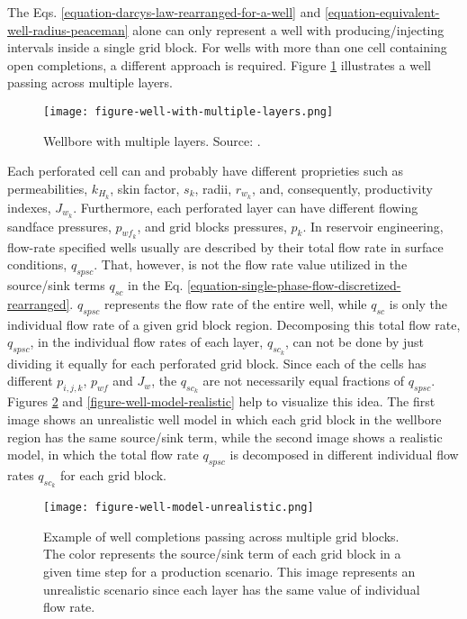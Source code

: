 The Eqs. \ref{equation-darcys-law-rearranged-for-a-well} and \ref{equation-equivalent-well-radius-peaceman} alone can only represent a well with producing/injecting intervals inside a single grid block.
%
For wells with more than one cell containing open completions, a different approach is required.
%
Figure \ref{figure-well-with-multiple-layers} illustrates a well passing across multiple layers.
%
\begin{figure}[h]
	\centering
	\texttt{[image: figure-well-with-multiple-layers.png]}
	\caption{Wellbore with multiple layers. Source: \cite{Ertekin2001}.}
	\label{figure-well-with-multiple-layers}
\end{figure}
%
Each perforated cell can and probably have different proprieties such as permeabilities, $k_{H_k}$, skin factor, $s_k$, radii, $r_{w_k}$, and, consequently, productivity indexes, $J_{w_k}$.
%
Furthermore, each perforated layer can have different flowing sandface pressures, $p_{{wf}_k}$, and grid blocks pressures, ${p_k}$.
%
In reservoir engineering, flow-rate specified wells usually are described by their total flow rate in surface conditions, $q_{spsc}$.
%
That, however, is not the flow rate value utilized in the source/sink terms $q_{sc}$ in the Eq. \ref{equation-single-phase-flow-discretized-rearranged}.
%
$q_{spsc}$ represents the flow rate of the entire well, while $q_{sc}$ is only the individual flow rate of a given grid block region.
%
Decomposing this total flow rate, $q_{spsc}$, in the individual flow rates of each layer, $q_{{sc}_k}$, can not be done by just dividing it equally for each perforated grid block.
%
Since each of the cells has different $p_{i,j,k}$, $p_{wf}$ and $J_{w}$, the $q_{{sc}_k}$ are not necessarily equal fractions of $q_{spsc}$.
%
Figures \ref{figure-well-model-unrealistic} and \ref{figure-well-model-realistic} help to visualize this idea.
%
The first image shows an unrealistic well model in which each grid block in the wellbore region has the same source/sink term, while the second image shows a realistic model, in which the total flow rate $q_{spsc}$ is decomposed in different individual flow rates $q_{{sc}_k}$ for each grid block.
%
\begin{figure}[H]
	\centering
	\texttt{[image: figure-well-model-unrealistic.png]}
	\caption{Example of well completions passing across multiple grid blocks. The color represents the source/sink term of each grid block in a given time step for a production scenario. This image represents an unrealistic scenario since each layer has the same value of individual flow rate.}
	\label{figure-well-model-unrealistic}
\end{figure}
